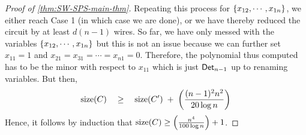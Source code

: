 \begin{proof}[Proof of \autoref{thm:SW-SPS-main-thm}]
Repeating this process for $\left\{x_{12}, \cdots, x_{1n}\right\}$, we either reach Case 1 (in which case we are done), or we have thereby reduced the circuit by at least $d(n-1)$ wires. So far, we have only messed with the variables $\left\{x_{12},\cdots, x_{1n}\right\}$ but this is not an issue because we can further set $x_{11} = 1$ and $x_{21} = x_{31} = \cdots = x_{n1} = 0$. Therefore, the polynomial thus computed has to be the minor with respect to $x_{11}$ which is just $\operatorname{\mathsf{Det}}_{n-1}$ up to renaming variables. But then,
\[
\mathrm{size}(C) \quad \geq \quad \mathrm{size}(C') \;+\; \left(\frac{(n-1)^2 n^2}{20\log n}\right)
\]
Hence, it follows by induction that $\mathrm{size}(C) \geq \left(\frac{n^4}{100\log n}\right) + 1$.
\end{proof}

